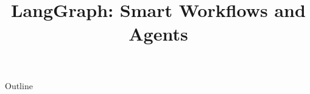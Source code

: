 \documentclass[xcolor=dvipsnames,compress,t,pdf,9pt]{beamer}
\title[\insertframenumber /\inserttotalframenumber]{LangGraph: Smart Workflows and Agents}
\begin{document}
	\begin{frame}
	\titlepage
	\end{frame}
	
	\begin{frame}{Outline}
	    \tableofcontents
	\end{frame}

         
	
	
\end{document}
